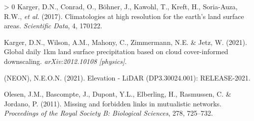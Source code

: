 \documentclass[11pt]{article}
\newlength{\cslhangindent}
\newenvironment{CSLReferences}[3] %
 {%
  \setlength{\parindent}{0pt}
  \ifodd #1 \everypar{\setlength{\hangindent}{\cslhangindent}}\ignorespaces\fi
  \ifnum #2 > 0
  \setlength{\parskip}{#2\baselineskip}
  \fi
 }%
 {}
\begin{document}
\hypertarget{refs}{}
\begin{CSLReferences}{1}{0}
\leavevmode\hypertarget{ref-Karger2017CliHig}{}%
Karger, D.N., Conrad, O., Böhner, J., Kawohl, T., Kreft, H., Soria-Auza,
R.W., \emph{et al.} (2017). Climatologies at high resolution for the
earth's land surface areas. \emph{Scientific Data}, 4, 170122.

\leavevmode\hypertarget{ref-Karger2021GloDai}{}%
Karger, D.N., Wilson, A.M., Mahony, C., Zimmermann, N.E. \& Jetz, W.
(2021). Global daily 1km land surface precipitation based on cloud
cover-informed downscaling. \emph{arXiv:2012.10108 {[}physics{]}}.

\leavevmode\hypertarget{ref-NationalEcologicalObservatoryNetworkNEON2021EleLid}{}%
(NEON), N.E.O.N. (2021). Elevation - LiDAR (DP3.30024.001):
RELEASE-2021.

\leavevmode\hypertarget{ref-Olesen2011MisFor}{}%
Olesen, J.M., Bascompte, J., Dupont, Y.L., Elberling, H., Rasmussen, C.
\& Jordano, P. (2011). Missing and forbidden links in mutualistic
networks. \emph{Proceedings of the Royal Society B: Biological
Sciences}, 278, 725--732.

\end{CSLReferences}
\end{document}
